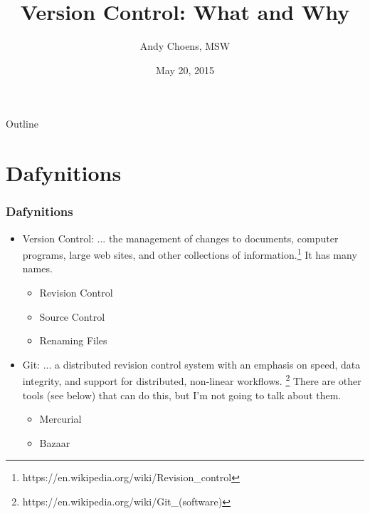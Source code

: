 \documentclass{beamer}
\title[Version Control Intro]{Version Control: What and Why}
\author{Andy Choens, MSW}
\institute{Office of Quality and Patient Safety}
\date{May 20, 2015}
\begin{document}
\begin{frame}
  \titlepage
\end{frame}

\begin{frame}{Outline}
  \tableofcontents
\end{frame}

\section{Dafynitions} %

\begin{frame}
  \frametitle{Dafynitions}
  \begin{itemize}
  \item Version Control: ... the management of changes to documents,
    computer programs, large web sites, and other collections of
    information.\footnote{https://en.wikipedia.org/wiki/Revision\_control}
    It has many names.
    \begin{itemize}
    \item Revision Control
    \item Source Control
    \item Renaming Files
    \end{itemize}
  \item Git: ... a distributed revision control system with an
    emphasis on speed, data integrity, and support for distributed,
    non-linear
    workflows. \footnote{https://en.wikipedia.org/wiki/Git\_(software)}
    There are other tools (see below) that can do this, but I'm not going to
    talk about them.
    \begin{itemize}
    \item Mercurial
    \item Bazaar
    \end{itemize}

  \end{itemize}
\end{frame}  
\end{document}
